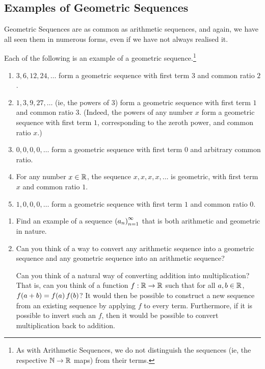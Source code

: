 \subsection{Examples of Geometric Sequences}

Geometric Sequences are as common as arithmetic sequences, and again, we have all seen them in numerous forms, even if we have not always realised it.

\begin{example}
    Each of the following is an example of a geometric sequence.\footnote{As with Arithmetic Sequences, we do not distinguish the sequences (ie, the respective $\mathbb{N} \to \mathbb{R}$ maps) from their terms.}
    \begin{enumerate}[noitemsep]
        \item $3,6,12,24,\ldots$ form a geometric sequence with first term $3$ and common ratio $2$.
        \item $1,3,9,27,\ldots$ (ie, the powers of $3$) form a geometric sequence with first term $1$ and common ratio $3$. (Indeed, the powers of any number $x$ form a geometric sequence with first term $1$, corresponding to the zeroth power, and common ratio $x$.)
        \item $0,0,0,0,\ldots$ form a geometric sequence with first term $0$ and arbitrary common ratio.
        \item For any number $x \in \mathbb{R}$, the sequence $x,x,x,x,\ldots$ is geometric, with first term $x$ and common ratio $1$.
        \item $1,0,0,0,\ldots$ form a geometric sequence with first term $1$ and common ratio $0$.
    \end{enumerate}
\end{example}

\begin{boxhexercise}
\hfill
\begin{enumerate}
    \item Find an example of a sequence $\left( a_n \right)_{n=1}^{\infty}$ that is both arithmetic and geometric in nature.
    \item Can you think of a way to convert any arithmetic sequence into a geometric sequence and any geometric sequence into an arithmetic sequence?
    \begin{hint}
        Can you think of a natural way of converting addition into multiplication? That is, can you think of a function $f : \mathbb{R} \to \mathbb{R}$ such that for all $a,b \in \mathbb{R}$, $f\!\left( a + b \right) = f\!\left( a \right) f\!\left( b \right)$? It would then be possible to construct a new sequence from an existing sequence by applying $f$ to every term. Furthermore, if it is possible to invert such an $f$, then it would be possible to convert multiplication back to addition.
    \end{hint}
\end{enumerate}
\end{boxhexercise}

